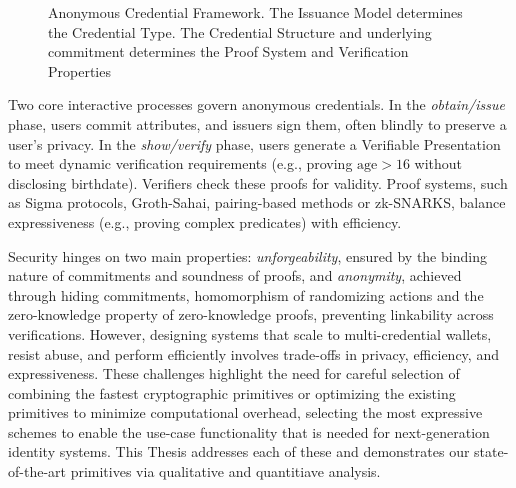 \begin{figure}
        
  
    \caption[Anonymous Credential Framework Diagram]{Anonymous Credential Framework. The Issuance Model determines the Credential Type. The Credential Structure and underlying commitment determines the Proof System and Verification Properties}
    \label{fig:chap1_anon_cred_framework}
\end{figure}

Two core interactive processes govern anonymous credentials. In the \emph{obtain/issue} phase, users commit attributes, and issuers sign them, often blindly to preserve a user's privacy. In the \emph{show/verify} phase, users generate a Verifiable Presentation to meet dynamic verification requirements (e.g., proving $ \text{age} > 16 $ without disclosing birthdate). Verifiers check these proofs for validity. Proof systems, such as Sigma protocols, Groth-Sahai, pairing-based methods or zk-SNARKS, balance expressiveness (e.g., proving complex predicates) with efficiency.


Security hinges on two main properties: \emph{unforgeability}, ensured by the binding nature of commitments and soundness of proofs, and \emph{anonymity}, achieved through hiding commitments, homomorphism of randomizing actions and the zero-knowledge property of zero-knowledge proofs, preventing linkability across verifications. However, designing systems that scale to multi-credential wallets, resist abuse, and perform efficiently involves trade-offs in privacy, efficiency, and expressiveness. These challenges highlight the need for careful selection of combining the fastest cryptographic primitives or optimizing the existing primitives to minimize computational overhead, selecting the most expressive schemes to enable the use-case functionality that is needed for next-generation identity systems.
This Thesis addresses each of these and demonstrates our state-of-the-art primitives via qualitative and quantitiave analysis. 



